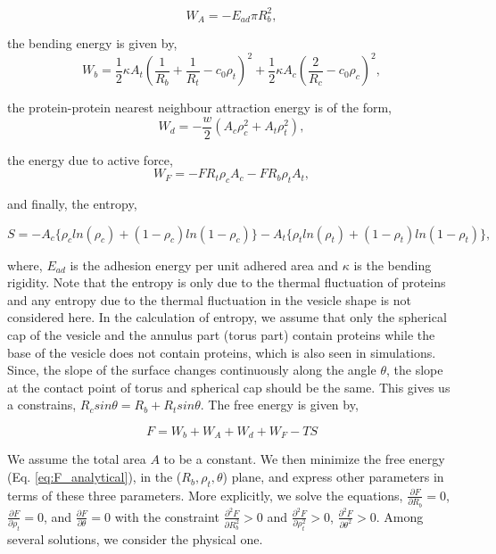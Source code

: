 \documentclass[pre,amsmath]{revtex4}
\begin{document}
\begin{equation}
    W_A= - E_{ad} \pi R_b^2,
\end{equation}

the bending energy is given by, 
\begin{equation}
W_b = \frac{1}{2} \kappa A_t ( \frac{1}{R_b} + \frac{1}{R_t} -c_0 \rho_t )^2 + \frac{1}{2} \kappa A_c (\frac{2}{R_c} - c_0 \rho_c)^2,
\end{equation}

the protein-protein nearest neighbour attraction energy is of the form,
\begin{equation}
W_d = -\frac{w}{2} (A_c \rho_c^2 + A_t \rho_t^2),
\label{rhoTerm}
\end{equation}

the energy due to active force,
\begin{equation}
W_F= - F R_t \rho_c A_c - F R_b \rho_t A_t,
\end{equation}

and finally, the entropy, 
 
\begin{equation}
    S=-A_c \{ \rho_c ln (\rho_c) + (1- \rho_c) ln (1-\rho_c)\}  -A_t \{ \rho_t ln (\rho_t) + (1- \rho_t) ln (1-\rho_t)\},
\end{equation}

where, $E_{ad}$ is the adhesion  energy per unit adhered area and $\kappa$ is the bending rigidity. Note that the entropy is only due to the thermal fluctuation of proteins and any entropy due to the thermal fluctuation in the vesicle shape is  not considered here. In the calculation of entropy, we assume that only the spherical cap of the vesicle and the annulus part (torus part) contain proteins while the base of the vesicle does not contain proteins, which is also seen in simulations. Since, the slope of the surface changes continuously along the angle $\theta$, the slope at the contact point of torus and spherical cap should be the same. This gives us a constrains, $R_c sin \theta = R_b + R_t sin \theta$.
The free energy is given by,

\begin{equation}
F=W_b + W_A + W_d + W_F- T S
\label{eq:F_analytical}
\end{equation}

We assume the total area $A$ to be a constant. We then minimize the free energy (Eq. \ref{eq:F_analytical}), in the ($R_b, \rho_t, \theta$) plane, and express other parameters in terms of these three parameters. More explicitly, we solve the equations, $\frac {\partial F}{\partial R_b} =0$, $\frac {\partial F}{\partial \rho_t} =0$, and $\frac {\partial F}{\partial \theta} =0$ with the constraint $\frac {\partial^2 F}{\partial R_b^2} > 0$ and $\frac {\partial^2 F}{\partial \rho_t^2} > 0$, $\frac {\partial^2 F}{\partial \theta^2} > 0$. Among several solutions, we consider the physical one.
\end{document}

